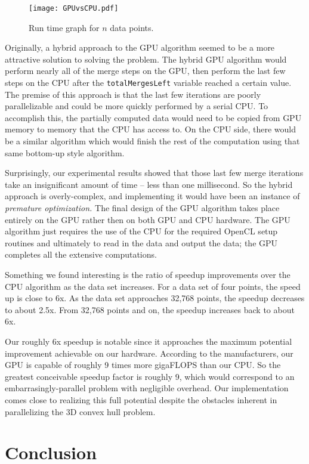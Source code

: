 \documentclass{article}
\begin{document}
\begin{figure}
\centering
\texttt{[image: GPUvsCPU.pdf]}
\caption{Run time graph for $n$ data points.}
\label{graph_figure}
\end{figure}

Originally, a hybrid approach to the GPU algorithm seemed to be a more attractive solution to solving the problem. The hybrid GPU algorithm would perform nearly all of the merge steps on the GPU, then perform the last few steps on the CPU after the \texttt{totalMergesLeft} variable reached a certain value. The premise of this approach is that the last few iterations are poorly parallelizable and could be more quickly performed by a serial CPU. To accomplish this, the partially computed data would need to be copied from GPU memory to memory that the CPU has access to. On the CPU side, there would be a similar algorithm which would finish the rest of the computation using that same bottom-up style algorithm.

Surprisingly, our experimental results showed that those last few merge iterations take an insignificant amount of time -- less than one millisecond. So the hybrid approach is overly-complex, and implementing it would have been an instance of \emph{premature optimization.} The final design of the GPU algorithm takes place entirely on the GPU rather then on both GPU and CPU hardware. The GPU algorithm just requires the use of the CPU for the required OpenCL setup routines and ultimately to read in the data and output the data; the GPU completes all the extensive computations. 

Something we found interesting is the ratio of speedup improvements over the CPU algorithm as the data set increases. For a data set of four points, the speed up is close to 6x. As the data set approaches 32,768 points, the speedup decreases to about 2.5x. From 32,768 points and on, the speedup increases back to about 6x.

Our roughly 6x speedup is notable since it approaches the maximum potential improvement achievable on our hardware. According to the manufacturers, our GPU is capable of roughly 9 times more gigaFLOPS than our CPU. So the greatest conceivable speedup factor is roughly 9, which would correspond to an embarrasingly-parallel problem with negligible overhead. Our implementation comes close to realizing this full potential despite the obstacles inherent in parallelizing the 3D convex hull problem.

\section{Conclusion}
\end{document}
